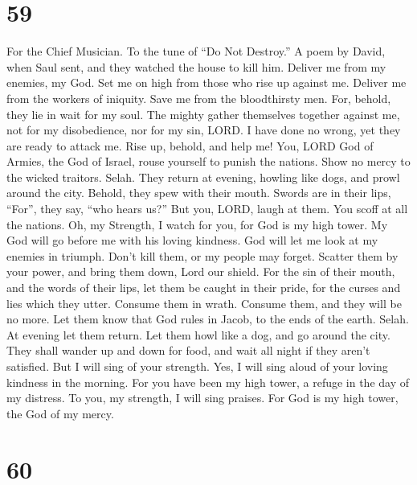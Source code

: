 \hypertarget{section-58}{%
\section{59}\label{section-58}}

For the Chief Musician. To the tune of ``Do Not Destroy.'' A poem by
David, when Saul sent, and they watched the house to kill him.
 Deliver me from my enemies, my God. Set me on high from
those who rise up against me.  Deliver me from the workers
of iniquity. Save me from the bloodthirsty men.  For,
behold, they lie in wait for my soul. The mighty gather themselves
together against me, not for my disobedience, nor for my sin, LORD.
 I have done no wrong, yet they are ready to attack me.
Rise up, behold, and help me!  You, LORD God of Armies,
the God of Israel, rouse yourself to punish the nations. Show no mercy
to the wicked traitors. Selah.  They return at evening,
howling like dogs, and prowl around the city.  Behold,
they spew with their mouth. Swords are in their lips, ``For'', they say,
``who hears us?''  But you, LORD, laugh at them. You scoff
at all the nations.  Oh, my Strength, I watch for you, for
God is my high tower.  My God will go before me with his
loving kindness. God will let me look at my enemies in triumph.
 Don't kill them, or my people may forget. Scatter them
by your power, and bring them down, Lord our shield.  For
the sin of their mouth, and the words of their lips, let them be caught
in their pride, for the curses and lies which they utter.
 Consume them in wrath. Consume them, and they will be no
more. Let them know that God rules in Jacob, to the ends of the earth.
Selah.  At evening let them return. Let them howl like a
dog, and go around the city.  They shall wander up and
down for food, and wait all night if they aren't satisfied.
 But I will sing of your strength. Yes, I will sing aloud
of your loving kindness in the morning. For you have been my high tower,
a refuge in the day of my distress.  To you, my strength,
I will sing praises. For God is my high tower, the God of my mercy.

\hypertarget{section-59}{%
\section{60}\label{section-59}}

